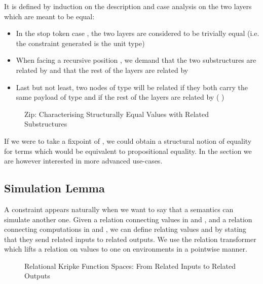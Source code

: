 It is defined by induction on the description and case analysis on the two
layers which are meant to be equal:
\begin{itemize}
  \item In the stop token case  , the two layers are considered to
    be trivially equal (i.e. the constraint generated is the unit type)
  \item When facing a recursive position { \AB{\Delta}  }, we
    demand that the two substructures are related by { \AB{\Delta} }
    and that the rest of the layers are related by   
  \item Last but not least, two nodes of type {  } will
    be related if they both carry the same payload  of type  and if
    the rest of the layers are related by { ( ) }
\end{itemize}

\begin{figure}[h]
\caption{Zip: Characterising Structurally Equal Values with Related Substructures}
\end{figure}

If we were to take a fixpoint of , we could obtain a structural
notion of equality for terms which would be equivalent to propositional
equality. In the section we are however interested in more advanced
use-cases.



\subsection{Simulation Lemma}

A  constraint appears naturally when we want to say that a
semantics can simulate another one. Given a relation  connecting values
in  and , and a relation  connecting computations in
 and , we can define  relating values
   and   
by stating that they send related inputs to related outputs. We use
the relation transformer  which lifts a relation on values
to one on environments in a pointwise manner.

\begin{figure}[h]
\caption{Relational Kripke Function Spaces: From Related Inputs to Related Outputs}
\end{figure}

